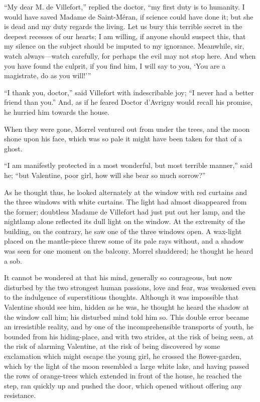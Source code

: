“My dear M. de Villefort,” replied the doctor, “my first duty is to
humanity. I would have saved Madame de Saint-Méran, if science could
have done it; but she is dead and my duty regards the living. Let us
bury this terrible secret in the deepest recesses of our hearts; I am
willing, if anyone should suspect this, that my silence on the subject
should be imputed to my ignorance. Meanwhile, sir, watch always—watch
carefully, for perhaps the evil may not stop here. And when you have
found the culprit, if you find him, I will say to you, ‘You are a
magistrate, do as you will!’”

“I thank you, doctor,” said Villefort with indescribable joy; “I never
had a better friend than you.” And, as if he feared Doctor d’Avrigny
would recall his promise, he hurried him towards the house.

When they were gone, Morrel ventured out from under the trees, and the
moon shone upon his face, which was so pale it might have been taken
for that of a ghost.

“I am manifestly protected in a most wonderful, but most terrible
manner,” said he; “but Valentine, poor girl, how will she bear so much
sorrow?”

As he thought thus, he looked alternately at the window with red
curtains and the three windows with white curtains. The light had
almost disappeared from the former; doubtless Madame de Villefort had
just put out her lamp, and the nightlamp alone reflected its dull light
on the window. At the extremity of the building, on the contrary, he
saw one of the three windows open. A wax-light placed on the
mantle-piece threw some of its pale rays without, and a shadow was seen
for one moment on the balcony. Morrel shuddered; he thought he heard a
sob.

It cannot be wondered at that his mind, generally so courageous, but
now disturbed by the two strongest human passions, love and fear, was
weakened even to the indulgence of superstitious thoughts. Although it
was impossible that Valentine should see him, hidden as he was, he
thought he heard the shadow at the window call him; his disturbed mind
told him so. This double error became an irresistible reality, and by
one of the incomprehensible transports of youth, he bounded from his
hiding-place, and with two strides, at the risk of being seen, at the
risk of alarming Valentine, at the risk of being discovered by some
exclamation which might escape the young girl, he crossed the
flower-garden, which by the light of the moon resembled a large white
lake, and having passed the rows of orange-trees which extended in
front of the house, he reached the step, ran quickly up and pushed the
door, which opened without offering any resistance.

